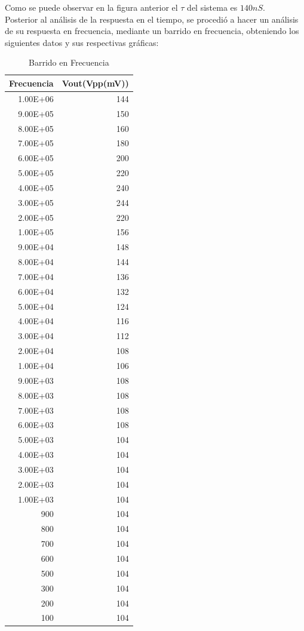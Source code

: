 \documentclass[letterpaper,12pt]{article}
\begin{document}
\justify
Como se puede observar en la figura anterior el $\tau$ del sistema es $140nS$.
\\
Posterior al análisis de la respuesta en el tiempo, se procedió a hacer un análisis de su respuesta en frecuencia, mediante un barrido en frecuencia, obteniendo los siguientes datos y sus respectivas gráficas:
\begin{table}
	\caption{Barrido en Frecuencia }
	\centering
	\begin{tabular}{|r|r|}	
		\hline
		\multicolumn{1}{|l|}{Frecuencia} & \multicolumn{1}{l|}{Vout(Vpp(mV))} \\ \hline
		1.00E+06 & 144 \\ \hline
		9.00E+05 & 150 \\ \hline
		8.00E+05 & 160 \\ \hline
		7.00E+05 & 180 \\ \hline
		6.00E+05 & 200 \\ \hline
		5.00E+05 & 220 \\ \hline
		4.00E+05 & 240 \\ \hline
		3.00E+05 & 244 \\ \hline
		2.00E+05 & 220 \\ \hline
		1.00E+05 & 156 \\ \hline
		9.00E+04 & 148 \\ \hline
		8.00E+04 & 144 \\ \hline
		7.00E+04 & 136 \\ \hline
		6.00E+04 & 132 \\ \hline
		5.00E+04 & 124 \\ \hline
		4.00E+04 & 116 \\ \hline
		3.00E+04 & 112 \\ \hline
		2.00E+04 & 108 \\ \hline
		1.00E+04 & 106 \\ \hline
		9.00E+03 & 108 \\ \hline
		8.00E+03 & 108 \\ \hline
		7.00E+03 & 108 \\ \hline
		6.00E+03 & 108 \\ \hline
		5.00E+03 & 104 \\ \hline
		4.00E+03 & 104 \\ \hline
		3.00E+03 & 104 \\ \hline
		2.00E+03 & 104 \\ \hline
		1.00E+03 & 104 \\ \hline
		900 & 104 \\ \hline
		800 & 104 \\ \hline
		700 & 104 \\ \hline
		600 & 104 \\ \hline
		500 & 104 \\ \hline
		300 & 104 \\ \hline
		200 & 104 \\ \hline
		100 & 104 \\ \hline
	\end{tabular}
	\label{Barrido en Frecuencia}
\end{table}
\end{document}
